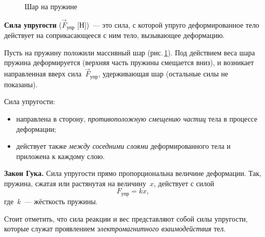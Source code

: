 \documentclass[main.tex]{subfiles}
\begin{document}
{%
\setlength\intextsep{0pt}
\begin{figure}
    \centering
    \caption{Шар на пружине}
    \label{fig:p40}
\end{figure}


\textbf{Сила упругости} ($\vec F_\text{упр}$ [Н])~--- это сила, с которой упруго деформированное тело действует на соприкасающееся с ним тело, вызывающее деформацию. 

Пусть на пружину положили массивный шар (рис.\,\ref{fig:p40}). Под действием веса шара пружина деформируется (верхняя часть пружины смещается вниз), и возникает направленная вверх сила~$\vec F_\text{упр}$, удерживающая шар (остальные силы не показаны).













Сила упругости:
\begin{itemize}
    \item направлена в
    сторону, \emph{противоположную смещению частиц} тела в процессе деформации;
    \item действует также \emph{между соседними слоями} деформированного тела и приложена к каждому слою.
\end{itemize}

}

\begin{law}
    \textbf{Закон Гука.} Сила упругости прямо пропорциональна величине деформации. Так, пружина, сжатая или растянутая на величину~$ x$, действует с силой
    \begin{equation}
    F_\text{упр}=kx,
    \end{equation}
    где~$k$~--- жёсткость пружины.
\end{law}

Стоит отметить, что сила реакции и вес представляют собой силы упругости, которые служат проявлением \emph{электромагнитного взаимодействия} тел.


 
\end{document}

